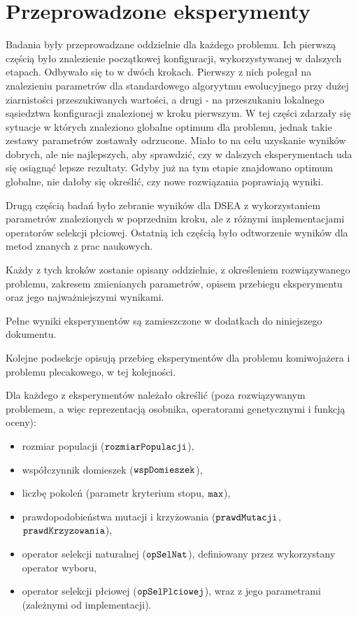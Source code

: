 \documentclass[./FM_mgr.tex]{subfiles}
\begin{document}
\section{Przeprowadzone eksperymenty}

Badania były przeprowadzane oddzielnie dla każdego problemu.
Ich pierwszą częścią było znalezienie początkowej konfiguracji, wykorzystywanej w dalszych etapach.
Odbywało się to w dwóch krokach.
Pierwszy z nich polegał na znalezieniu parametrów dla standardowego algoryytmu ewolucyjnego przy dużej ziarnistości przeszukiwanych wartości, a drugi - na przeszukaniu lokalnego sąsiedztwa konfiguracji znalezionej w kroku pierwszym.
W tej części zdarzały się sytuacje w których znaleziono globalne optimum dla problemu, jednak takie zestawy parametrów zostawały odrzucone.
Miało to na celu uzyskanie wyników dobrych, ale nie najlepszych, aby sprawdzić, czy w dalszych eksperymentach uda się osiągnąć lepsze rezultaty.
Gdyby już na tym etapie znajdowano optimum globalne, nie dałoby się określić, czy nowe rozwiązania poprawiają wyniki.

Drugą częścią badań było zebranie wyników dla DSEA z wykorzystaniem parametrów znalezionych w poprzednim kroku, ale z różnymi implementacjami operatorów selekcji płciowej.
Ostatnią ich częścią było odtworzenie wyników dla metod znanych z prac naukowych.

Każdy z tych kroków zostanie opisany oddzielnie, z określeniem rozwiązywanego problemu, zakresem zmienianych parametrów, opisem przebiegu eksperymentu oraz jego najważniejszymi wynikami.

Pełne wyniki eksperymentów są zamieszczone w dodatkach do niniejszego dokumentu.

Kolejne podsekcje opisują przebieg eksperymentów dla problemu komiwojażera i problemu plecakowego, w tej kolejności.

Dla każdego z eksperymentów należało określić (poza rozwiązywanym problemem, a więc reprezentacją osobnika, operatorami genetycznymi i funkcją oceny):

\begin{itemize}
	\item rozmiar populacji ($\mathtt{rozmiarPopulacji}$),
	\item współczynnik domieszek ($\mathtt{wspDomieszek}$),
	\item liczbę pokoleń (parametr kryterium stopu, $\mathtt{max}$),
	\item prawdopodobieństwa mutacji i krzyżowania ($\mathtt{prawdMutacji}$, $\mathtt{prawdKrzyzowania}$),
	\item operator selekcji naturalnej ($\mathtt{opSelNat}$), definiowany przez wykorzystany operator wyboru,
	\item operator selekcji płciowej ($\mathtt{opSelPlciowej}$), wraz z jego parametrami (zależnymi od implementacji).
\end{itemize}
\end{document}
